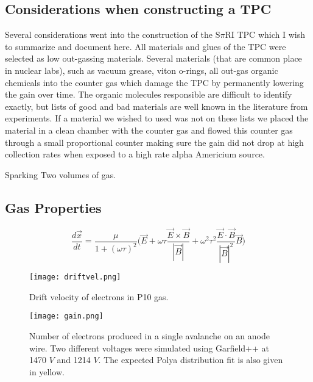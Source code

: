 \subsection{Considerations when constructing a TPC}
Several considerations went into the construction of the S$\pi$RI TPC which I wish to summarize and document here. All materials and glues of the TPC were selected as low out-gassing materials. Several materials (that are common place in nuclear labs), such as vacuum grease, viton o-rings, all out-gas organic chemicals into the counter gas which damage the TPC by permanently lowering the gain over time. The organic molecules responsible are difficult to identify exactly, but lists of good and bad materials are well known in the literature from experiments. If a material we wished to used was not on these lists we placed the material in a clean chamber with the counter gas and flowed this counter gas through a small proportional counter making sure the gain did not drop at high collection rates when exposed to a high rate alpha Americium source. 

Sparking
Two volumes of gas. 


\subsection{Gas Properties}

\begin{equation}
\frac{d\vec{x}}{dt} = \frac{\mu}{1+(\omega\tau)^2}\Big(\vec{E} + \omega\tau\frac{\vec{E}\times\vec{B}}{|\vec{B}|}+\omega^2\tau^2\frac{\vec{E}\cdot\vec{B}}{|\vec{B}|^2}\vec{B}\Big)
\label{eq:elecdrift}
\end{equation}

\begin{figure}[H]
\texttt{[image: driftvel.png]}
\caption{Drift velocity of electrons in P10 gas.}
\label{fig:driftvel}
\end{figure}

\begin{figure}
\texttt{[image: gain.png]}
\caption{Number of electrons produced in a single avalanche on an anode wire. Two different voltages were simulated using Garfield++ at 1470 $V$ and 1214 $V$. The expected Polya distribution fit is also given in yellow.}
\label{fig:anodegain}
\end{figure}

